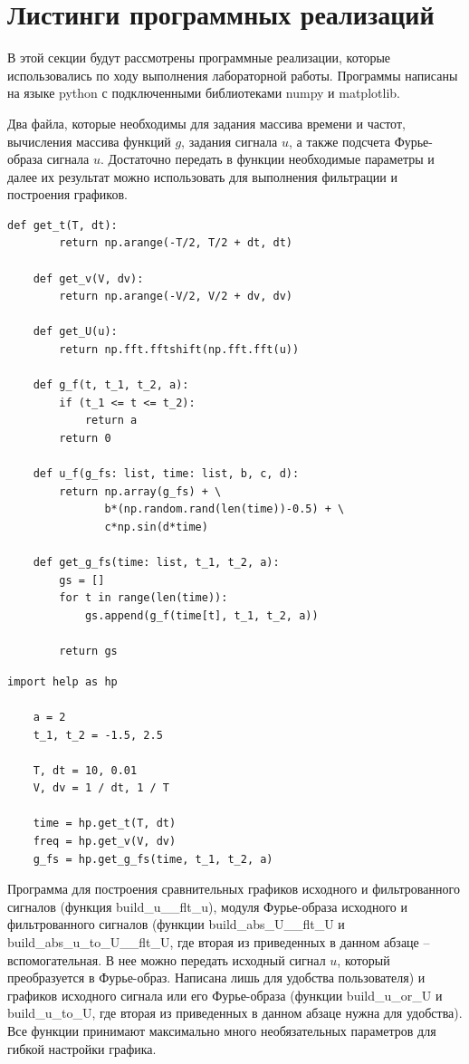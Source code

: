 \documentclass[a4paper, 12pt]{article}
\begin{document}
    
    \section{Листинги программных реализаций}
    В этой секции будут рассмотрены программные реализации, которые использовались по ходу выполнения лабораторной работы.
    Программы написаны на языке python с подключенными библиотеками numpy и matplotlib.


    Два файла, которые необходимы для задания массива времени и частот, вычисления массива функций $g$, задания
    сигнала $u$, а также подсчета Фурье-образа сигнала $u$. Достаточно передать в функции необходимые параметры и
    далее их результат можно использовать для выполнения фильтрации и построения графиков.


    \begin{lstlisting}[label=l1, caption={Файл help.py. Вспомогательные функции}]
    def get_t(T, dt):
        return np.arange(-T/2, T/2 + dt, dt)   
        
    def get_v(V, dv):
        return np.arange(-V/2, V/2 + dv, dv)
          
    def get_U(u):
        return np.fft.fftshift(np.fft.fft(u))
        
    def g_f(t, t_1, t_2, a):
        if (t_1 <= t <= t_2):
            return a
        return 0
        
    def u_f(g_fs: list, time: list, b, c, d):
        return np.array(g_fs) + \
               b*(np.random.rand(len(time))-0.5) + \
               c*np.sin(d*time)
        
    def get_g_fs(time: list, t_1, t_2, a):
        gs = []
        for t in range(len(time)):
            gs.append(g_f(time[t], t_1, t_2, a))
        
        return gs   
    \end{lstlisting}
    \begin{lstlisting}[label=l2, caption={Файл static.py. Вспомогательные переменные}]
    import help as hp

    a = 2
    t_1, t_2 = -1.5, 2.5

    T, dt = 10, 0.01
    V, dv = 1 / dt, 1 / T

    time = hp.get_t(T, dt)
    freq = hp.get_v(V, dv)
    g_fs = hp.get_g_fs(time, t_1, t_2, a)
    \end{lstlisting}


    Программа для построения сравнительных графиков исходного и фильтрованного сигналов (функция build\_{u}\_\_{flt}\_{u}), 
    модуля Фурье-образа исходного и фильтрованного сигналов (функции build\_{abs}\_{U}\_\_{flt}\_{U} и build\_{abs}\_{u}\_{to}\_{U}\_\_{flt}\_{U}, 
    где вторая из приведенных в данном абзаце -- вспомогательная. В нее можно передать исходный сигнал $u$, который преобразуется в Фурье-образ.
    Написана лишь для удобства пользователя) и графиков исходного сигнала или его Фурье-образа (функции build\_{u}\_{or}\_{U} и build\_{u}\_{to}\_{U}, 
    где вторая из приведенных в данном абзаце нужна для удобства). Все функции принимают максимально много необязательных параметров для гибкой настройки
    графика.
\end{document}
